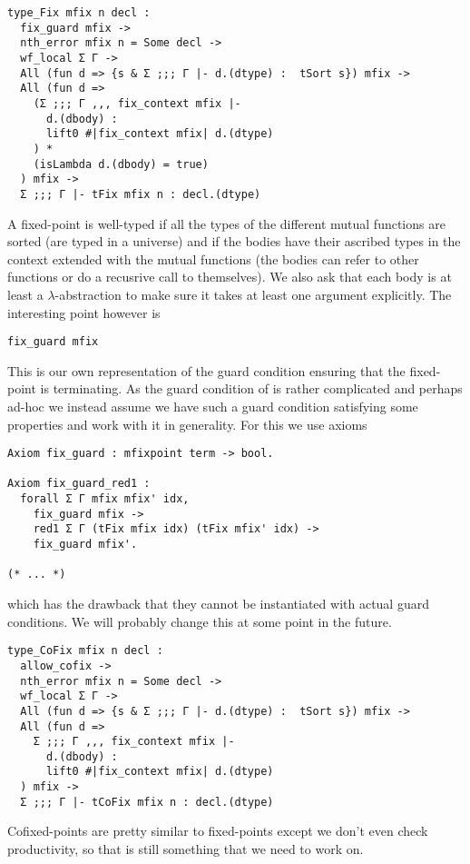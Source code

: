 \begin{verbatim}
type_Fix mfix n decl :
  fix_guard mfix ->
  nth_error mfix n = Some decl ->
  wf_local Σ Γ ->
  All (fun d => {s & Σ ;;; Γ |- d.(dtype) :  tSort s}) mfix ->
  All (fun d =>
    (Σ ;;; Γ ,,, fix_context mfix |-
      d.(dbody) :
      lift0 #|fix_context mfix| d.(dtype)
    ) *
    (isLambda d.(dbody) = true)
  ) mfix ->
  Σ ;;; Γ |- tFix mfix n : decl.(dtype)
\end{verbatim}
A fixed-point is well-typed if all the types of the different mutual functions
are sorted (\ie are typed in a universe) and if the bodies have their ascribed
types in the context extended with the mutual functions (the bodies can refer
to other functions or do a recusrive call to themselves).
We also ask that each body is at least a \(\lambda\)-abstraction to make sure it
takes at least one argument explicitly.
The interesting point however is
\begin{verbatim}
fix_guard mfix
\end{verbatim}
This is our own representation of the guard condition ensuring that the
fixed-point is terminating. As the guard condition of \Coq is rather complicated
and perhaps ad-hoc we instead assume we have such a guard condition satisfying
some properties and work with it in generality.
For this we use axioms
\begin{verbatim}
Axiom fix_guard : mfixpoint term -> bool.

Axiom fix_guard_red1 :
  forall Σ Γ mfix mfix' idx,
    fix_guard mfix ->
    red1 Σ Γ (tFix mfix idx) (tFix mfix' idx) ->
    fix_guard mfix'.

(* ... *)
\end{verbatim}
which has the drawback that they cannot be instantiated with actual guard
conditions. We will probably change this at some point in the future.

\begin{verbatim}
type_CoFix mfix n decl :
  allow_cofix ->
  nth_error mfix n = Some decl ->
  wf_local Σ Γ ->
  All (fun d => {s & Σ ;;; Γ |- d.(dtype) :  tSort s}) mfix ->
  All (fun d =>
    Σ ;;; Γ ,,, fix_context mfix |-
      d.(dbody) :
      lift0 #|fix_context mfix| d.(dtype)
  ) mfix ->
  Σ ;;; Γ |- tCoFix mfix n : decl.(dtype)
\end{verbatim}
Cofixed-points are pretty similar to fixed-points except we don't even check
productivity, so that is still something that we need to work on.

